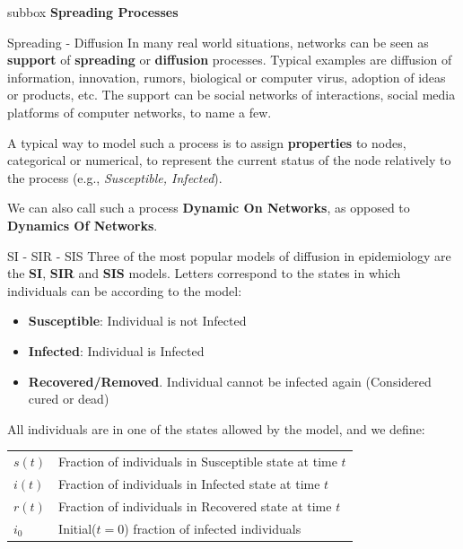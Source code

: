 \documentclass[a4paper,11pt]{book}
\begin{document}

\newpage



\begin{subbox}{subbox}{}
\centering
\Large{\textbf{Spreading Processes}}
\end{subbox}




\begin{textbox}{Spreading - Diffusion}
In many real world situations, networks can be seen as \textbf{support} of \textbf{spreading} or \textbf{diffusion} processes. Typical examples are diffusion of information, innovation, rumors, biological or computer virus, adoption of ideas or products, etc.  The support can be social networks of interactions, social media platforms of computer networks, to name a few.

A typical way to model such a process is to assign \textbf{properties} to nodes, categorical or numerical, to represent the current status of the node relatively to the process (e.g., \textit{Susceptible, Infected}). 

We can also call such a process \textbf{Dynamic On Networks}, as opposed to \textbf{Dynamics Of Networks}.

\end{textbox}


\begin{textbox}{SI - SIR - SIS}
Three of the most popular models of diffusion in epidemiology are the \textbf{SI}, \textbf{SIR} and \textbf{SIS} models. Letters correspond to the states in which individuals can be according to the model:
\begin{itemize}
    \item \textbf{Susceptible}: Individual is not Infected
    \item \textbf{Infected}: Individual is Infected
    \item \textbf{Recovered/Removed}. Individual cannot be infected again (Considered cured or dead)
\end{itemize}


All individuals are in one of the states allowed by the model, and we define:

\begin{tabular}{p{}|p{}}\scriptsize
$s(t)$ & Fraction of individuals in Susceptible state at time $t$ \\
$i(t)$ & Fraction of individuals in Infected state at time $t$\\
$r(t)$ & Fraction of individuals in Recovered state at time $t$\\
$i_0$ & Initial($t=0$) fraction of infected individuals\\
\end{tabular}

\end{textbox}
\end{document}
